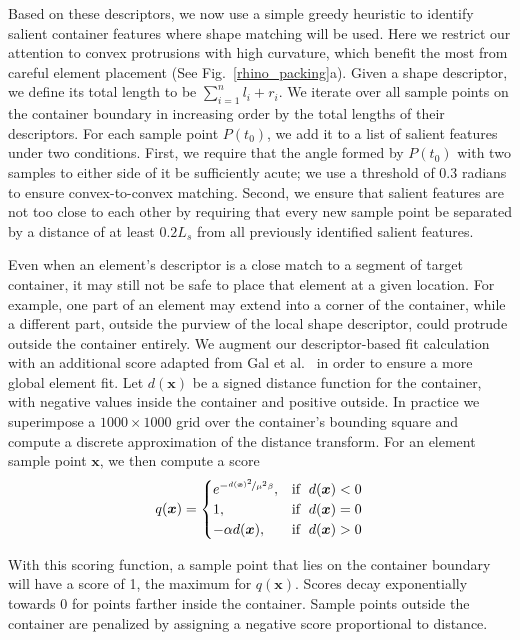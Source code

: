 Based on these descriptors, we now use a simple greedy heuristic to identify salient container features where shape matching will be used.
Here we restrict our attention to convex protrusions with high curvature, which benefit the most from careful element placement (See Fig.~\ref{rhino_packing}a).  Given a shape descriptor, we define its total length to be $\sum_{i=1}^nl_i+r_i$.  We iterate over all sample points on the container boundary in increasing order by the total lengths of their descriptors.  For each sample point $P(t_0)$, we add it to a list of salient features under two conditions. First, we require that the angle formed by $P(t_0)$ with two samples to either side of it be sufficiently acute; we use a threshold of 0.3 radians to ensure convex-to-convex matching.
Second, we ensure that salient features are not too close to each other by requiring that every new sample point be separated by a distance of at least $0.2L_s$ from all previously identified salient features.

Even when an element's descriptor is a close match to a segment of 
target container, 
it may still not be safe to place that element at a given location.
For example, one part of an element may extend into a corner of the container,
while a different part, outside the purview of the local shape descriptor,
could protrude outside the container entirely.  We augment our 
descriptor-based fit calculation with an additional score adapted from
Gal et al.~\cite{Gal2007B} in order to ensure a more global element fit.
Let $d(\bm{x})$ be a signed distance function for the container, with
negative values inside the container and positive outside.  In practice we
superimpose a $1000\times 1000$ grid over the container's bounding square and
compute a discrete approximation of the distance transform.  For an element
sample point $\bm{x}$, we then compute a score
\begin{equation}
 q(\bm{x}) =\begin{cases}    
    e^{-\nicefrac{d(\bm{x})^2}{\mu^2\beta}}, & \mathrm{if} \;\; d(\bm{x}) < 0 \\
    1, & \mathrm{if} \;\;d(\bm{x}) = 0 \\
    - \alpha d(\bm{x}), & \mathrm{if}\;\; d(\bm{x}) > 0    
  \end{cases}
\end{equation}

With this scoring function, a sample point that lies on the container boundary
will have a score of 1, the maximum for $q(\bm{x})$.
Scores decay exponentially towards 0
for points farther inside the container.  Sample points outside the container
are penalized by assigning a negative score proportional to distance.

